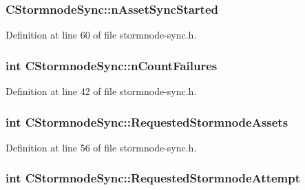 \subsubsection[{n\+Asset\+Sync\+Started}]{ C\+Stormnode\+Sync\+::n\+Asset\+Sync\+Started}\label{class_c_stormnode_sync_a2e7baab6709175db874ce9bc325c762d}


Definition at line 60 of file stormnode-\/sync.\+h.

\hypertarget{class_c_stormnode_sync_ad7944c7fc57bc0288472b1f88fbd88e6}{}
\subsubsection[{n\+Count\+Failures}]{\setlength{\rightskip}{0pt plus 5cm}int C\+Stormnode\+Sync\+::n\+Count\+Failures}\label{class_c_stormnode_sync_ad7944c7fc57bc0288472b1f88fbd88e6}


Definition at line 42 of file stormnode-\/sync.\+h.

\hypertarget{class_c_stormnode_sync_abd82a675dc58c17710dac55b20426945}{}
\subsubsection[{Requested\+Stormnode\+Assets}]{\setlength{\rightskip}{0pt plus 5cm}int C\+Stormnode\+Sync\+::\+Requested\+Stormnode\+Assets}\label{class_c_stormnode_sync_abd82a675dc58c17710dac55b20426945}


Definition at line 56 of file stormnode-\/sync.\+h.

\hypertarget{class_c_stormnode_sync_a66dcbc68478f042210ec161a7aba7fd5}{}
\subsubsection[{Requested\+Stormnode\+Attempt}]{\setlength{\rightskip}{0pt plus 5cm}int C\+Stormnode\+Sync\+::\+Requested\+Stormnode\+Attempt}\label{class_c_stormnode_sync_a66dcbc68478f042210ec161a7aba7fd5}


